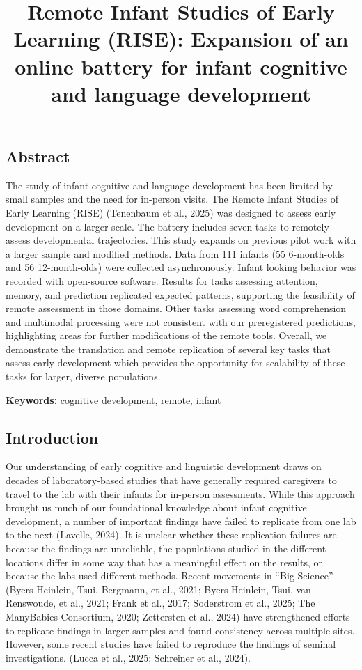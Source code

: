 \documentclass[
  english,
  man,floatsintext]{apa6}
\title{Remote Infant Studies of Early Learning (RISE): Expansion of an online battery for infant cognitive and language development}
\author{\phantom{0}}
\date{}
\affiliation{\phantom{0}}
\begin{document}
\maketitle

\subsection{Abstract}\label{abstract}

The study of infant cognitive and language development has been limited by small samples and the need for in-person visits.
The Remote Infant Studies of Early Learning (RISE) (Tenenbaum et al., 2025) was designed to assess early development on a larger scale.
The battery includes seven tasks to remotely assess developmental trajectories.
This study expands on previous pilot work with a larger sample and modified methods.
Data from 111 infants (55 6-month-olds and 56 12-month-olds) were collected asynchronously.
Infant looking behavior was recorded with open-source software.
Results for tasks assessing attention, memory, and prediction replicated expected patterns, supporting the feasibility of remote assessment in those domains.
Other tasks assessing word comprehension and multimodal processing were not consistent with our preregistered predictions, highlighting areas for further modifications of the remote tools.
Overall, we demonstrate the translation and remote replication of several key tasks that assess early development which provides the opportunity for scalability of these tasks for larger, diverse populations.

\textbf{Keywords:} cognitive development, remote, infant

\newpage

\subsection{Introduction}\label{introduction}

Our understanding of early cognitive and linguistic development draws on decades of laboratory-based studies that have generally required caregivers to travel to the lab with their infants for in-person assessments.
While this approach brought us much of our foundational knowledge about infant cognitive development, a number of important findings have failed to replicate from one lab to the next (Lavelle, 2024).
It is unclear whether these replication failures are because the findings are unreliable, the populations studied in the different locations differ in some way that has a meaningful effect on the results, or because the labs used different methods.
Recent movements in ``Big Science'' (Byers-Heinlein, Tsui, Bergmann, et al., 2021; {Byers-Heinlein, Tsui, van Renswoude, et al.}, 2021; Frank et al., 2017; Soderstrom et al., 2025; The ManyBabies Consortium, 2020; Zettersten et al., 2024) have strengthened efforts to replicate findings in larger samples and found consistency across multiple sites. However, some recent studies have failed to reproduce the findings of seminal investigations.
(Lucca et al., 2025; Schreiner et al., 2024).
\end{document}
